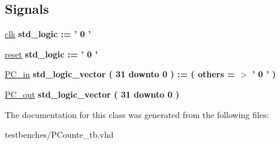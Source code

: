 \subsection*{\-Signals}
 \begin{DoxyCompactItemize}
\item 
\hypertarget{class_p_counte__tb_1_1behavior_acb38257efabc3b2fa08d2a365cd7ff01}{\hyperlink{class_p_counte__tb_1_1behavior_acb38257efabc3b2fa08d2a365cd7ff01}{clk} {\bfseries std\-\_\-logic  \-:= '  0  ' } }\label{class_p_counte__tb_1_1behavior_acb38257efabc3b2fa08d2a365cd7ff01}

\item 
\hypertarget{class_p_counte__tb_1_1behavior_afedcb12b726c79840717ef89dbe704ed}{\hyperlink{class_p_counte__tb_1_1behavior_afedcb12b726c79840717ef89dbe704ed}{reset} {\bfseries std\-\_\-logic  \-:= '  0  ' } }\label{class_p_counte__tb_1_1behavior_afedcb12b726c79840717ef89dbe704ed}

\item 
\hypertarget{class_p_counte__tb_1_1behavior_ac2dd31bad98644f37a6e62a770f5a5f7}{\hyperlink{class_p_counte__tb_1_1behavior_ac2dd31bad98644f37a6e62a770f5a5f7}{\-P\-C\-\_\-in} {\bfseries std\-\_\-logic\-\_\-vector (   31    downto    0  )  \-:= (  others  = $>$ '  0  '  ) } }\label{class_p_counte__tb_1_1behavior_ac2dd31bad98644f37a6e62a770f5a5f7}

\item 
\hypertarget{class_p_counte__tb_1_1behavior_a43d3d66618c7e36ea6b882156984c629}{\hyperlink{class_p_counte__tb_1_1behavior_a43d3d66618c7e36ea6b882156984c629}{\-P\-C\-\_\-out} {\bfseries std\-\_\-logic\-\_\-vector (   31    downto    0  ) } }\label{class_p_counte__tb_1_1behavior_a43d3d66618c7e36ea6b882156984c629}

\end{DoxyCompactItemize}


\-The documentation for this class was generated from the following files\-:\begin{DoxyCompactItemize}
\item 
testbenches/\-P\-Counte\-\_\-tb.\-vhd\end{DoxyCompactItemize}
